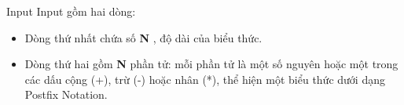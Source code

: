 Input
Input gồm hai dòng:  
\begin{itemize}
	\item     Dòng thứ nhất chứa số    \textbf{     N    }    , độ dài của biểu thức.   
	\item     Dòng thứ hai gồm    \textbf{     N    }    phần tử: mỗi phần tử là một số nguyên hoặc một trong các dấu cộng (+), trừ (-) hoặc nhân (*), thể hiện một biểu thức dưới dạng Postfix Notation.   
\end{itemize}